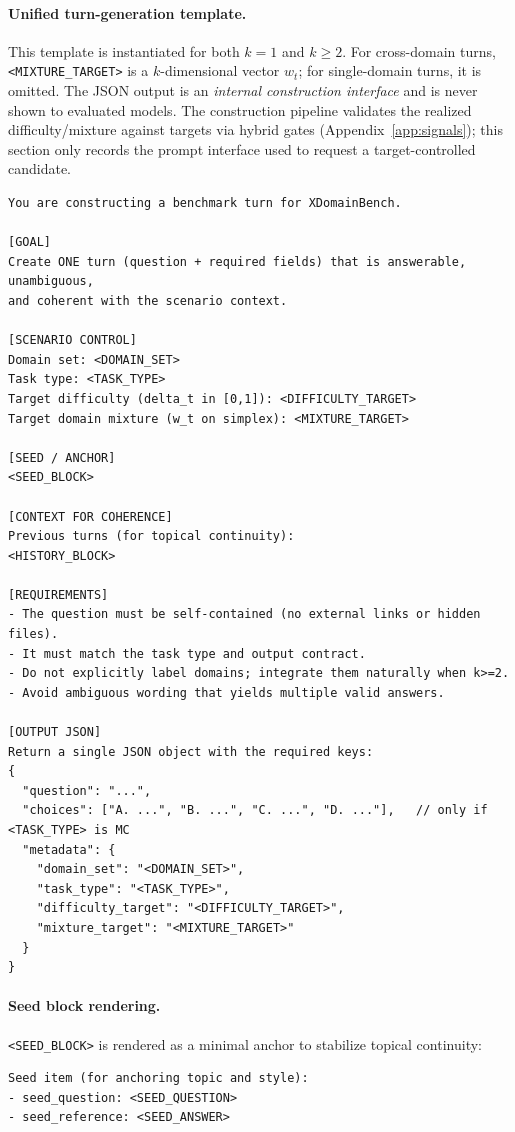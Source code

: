 \paragraph{Unified turn-generation template.}
This template is instantiated for both $k=1$ and $k\ge 2$.
For cross-domain turns, \texttt{<MIXTURE\_TARGET>} is a $k$-dimensional vector $w_t$; for single-domain turns, it is omitted.
The JSON output is an \emph{internal construction interface} and is never shown to evaluated models. The construction pipeline validates the realized difficulty/mixture against targets via hybrid gates (Appendix~\ref{app:signals}); this section only records the prompt interface used to request a target-controlled candidate.
\\
\begin{lstlisting}[frame=single]
You are constructing a benchmark turn for XDomainBench.

[GOAL]
Create ONE turn (question + required fields) that is answerable, unambiguous,
and coherent with the scenario context.

[SCENARIO CONTROL]
Domain set: <DOMAIN_SET>
Task type: <TASK_TYPE>
Target difficulty (delta_t in [0,1]): <DIFFICULTY_TARGET>
Target domain mixture (w_t on simplex): <MIXTURE_TARGET>

[SEED / ANCHOR]
<SEED_BLOCK>

[CONTEXT FOR COHERENCE]
Previous turns (for topical continuity):
<HISTORY_BLOCK>

[REQUIREMENTS]
- The question must be self-contained (no external links or hidden files).
- It must match the task type and output contract.
- Do not explicitly label domains; integrate them naturally when k>=2.
- Avoid ambiguous wording that yields multiple valid answers.

[OUTPUT JSON]
Return a single JSON object with the required keys:
{
  "question": "...",
  "choices": ["A. ...", "B. ...", "C. ...", "D. ..."],   // only if <TASK_TYPE> is MC
  "metadata": {
    "domain_set": "<DOMAIN_SET>",
    "task_type": "<TASK_TYPE>",
    "difficulty_target": "<DIFFICULTY_TARGET>",
    "mixture_target": "<MIXTURE_TARGET>"
  }
}
\end{lstlisting}

\paragraph{Seed block rendering.}
\texttt{<SEED\_BLOCK>} is rendered as a minimal anchor to stabilize topical continuity:
\\
\begin{lstlisting}[frame=single]
Seed item (for anchoring topic and style):
- seed_question: <SEED_QUESTION>
- seed_reference: <SEED_ANSWER>
\end{lstlisting}

